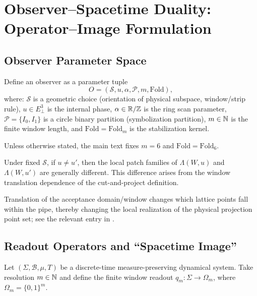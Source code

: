 \section{Observer--Spacetime Duality: Operator--Image Formulation}

\subsection{Observer Parameter Space}

\begin{definition}\label{def:observer}
Define an observer as a parameter tuple
\[
O=(\mathcal{S},u,\alpha,\mathcal{P},m,\mathrm{Fold}),
\]
where: $\mathcal{S}$ is a geometric choice (orientation of physical subspace, window/strip rule), $u\in E_{\perp}^{3}$ is the internal phase, $\alpha\in\mathbb{R}/\mathbb{Z}$ is the ring scan parameter, $\mathcal{P}=\{I_0,I_1\}$ is a circle binary partition (symbolization partition), $m\in\mathbb{N}$ is the finite window length, and $\mathrm{Fold}=\mathrm{Fold}_m$ is the stabilization kernel.
\end{definition}

\begin{assumption}\label{assump:m6-fixed-main}
Unless otherwise stated, the main text fixes $m=6$ and $\mathrm{Fold}=\mathrm{Fold}_6$.
\end{assumption}

\begin{proposition}\label{prop:patch-difference}
Under fixed $\mathcal{S}$, if $u\neq u'$, then the local patch families of $\Lambda(W,u)$ and $\Lambda(W,u')$ are generally different. This difference arises from the window translation dependence of the cut-and-project definition.
\end{proposition}

\begin{remark}
Translation of the acceptance domain/window changes which lattice points fall within the pipe, thereby changing the local realization of the physical projection point set; see the relevant entry in \cite{IUCRAcceptanceDomain}.
\end{remark}

\subsection{Readout Operators and ``Spacetime Image''}

Let $(\Sigma,\mathcal{B},\mu,T)$ be a discrete-time measure-preserving dynamical system. Take resolution $m\in\mathbb{N}$ and define the finite window readout $q_m:\Sigma\to\Omega_m$, where $\Omega_m=\{0,1\}^{m}$.

